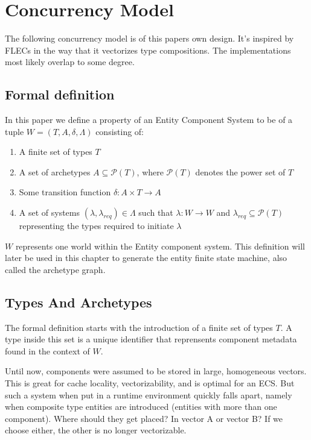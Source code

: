
\section{Concurrency Model}
\label{chap:2}
The following concurrency model is of this papers own design. It's inspired by FLECs in the way that it vectorizes type compositions. The implementations most likely overlap to some degree.

\subsection{Formal definition} \label{section:formal_definition}
In this paper we define a property of an Entity Component System to be of a tuple $W = (T, A, \delta, \Lambda)$ consisting of:
\begin{enumerate}
    \item A finite set of types $T$
    \item A set of archetypes $A \subseteq \mathcal{P}(T)$, where $\mathcal{P}(T)$ denotes the power set of $T$    
    \item Some transition function $\delta : A \times T \rightarrow A$
    \item A set of systems $(\lambda, \lambda_{req}) \in \Lambda$ such that $\lambda : W \rightarrow W$ and $\lambda_{req} \subseteq \mathcal{P}(T)$ representing the types required to initiate $\lambda$
\end{enumerate}
$W$ represents one world within the Entity component system. This definition will later be used in this chapter to generate the entity finite state machine, also called the archetype graph.

\subsection{Types And Archetypes}
The formal definition starts with the introduction of a finite set of types $T$. A type inside this set is a unique identifier that reprensents component metadata found in the context of $W$.

Until now, components were assumed to be stored in large, homogeneous vectors. This is great for cache locality, vectorizability, and is optimal for an ECS. But such a system when put in a runtime environment quickly falls apart, namely when composite type entities are introduced (entities with more than one component). Where should they get placed? In vector A or vector B? If we choose either, the other is no longer vectorizable. 

